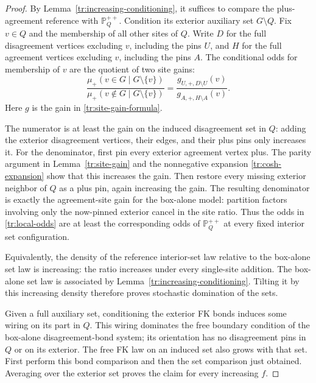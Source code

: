 \begin{proof}
By Lemma~\ref{tr:increasing-conditioning}, it suffices to compare the
plus-agreement reference with $\mathbb P_Q^{++}$. Condition its exterior
auxiliary set $G\setminus Q$. Fix $v\in Q$ and the membership of all other
sites of $Q$. Write $D$ for the full disagreement vertices excluding $v$,
including the pins $U$, and $H$ for the full agreement vertices excluding
$v$, including the pins $A$. The conditional odds for membership of $v$
are the quotient of two site gains:
\begin{equation}
\label{tr:local-odds}
 \frac{\mu_+(v\in G\mid G\setminus\{v\})}
 {\mu_+(v\notin G\mid G\setminus\{v\})}
 =\frac{g_{U,+,D\setminus U}(v)}
             {g_{A,+,H\setminus A}(v)}.
\end{equation}
Here $g$ is the gain in \eqref{tr:site-gain-formula}.

The numerator is at least the gain on the induced disagreement set in
$Q$: adding the exterior disagreement vertices, their edges, and their
plus pins only increases it. For the denominator, first pin every exterior
agreement vertex plus. The parity argument in Lemma~\ref{tr:site-gain}
and the nonnegative expansion \eqref{tr:cosh-expansion} show that this
increases the gain. Then restore every missing exterior neighbor of $Q$
as a plus pin, again increasing the gain. The resulting denominator is
exactly the agreement-site gain for the box-alone model: partition
factors involving only the now-pinned exterior cancel in the site ratio.
Thus the odds
in \eqref{tr:local-odds} are at least the corresponding odds of
$\mathbb P_Q^{++}$ at every fixed interior set configuration.

Equivalently, the density of the reference interior-set law relative to
the box-alone set law is increasing: the ratio increases under every
single-site addition. The box-alone set law is associated by
Lemma~\ref{tr:increasing-conditioning}. Tilting it by this increasing
density therefore proves stochastic domination of the sets.

Given a full auxiliary set, conditioning the exterior FK bonds induces
some wiring on its part in $Q$. This wiring dominates the free boundary
condition of the box-alone disagreement-bond system; its orientation has
no disagreement pins in $Q$ or on its exterior. The free FK law on an
induced set also grows with that set. First perform this bond comparison
and then the set comparison just obtained. Averaging over the exterior
set proves the claim for every increasing $f$.
\end{proof}

